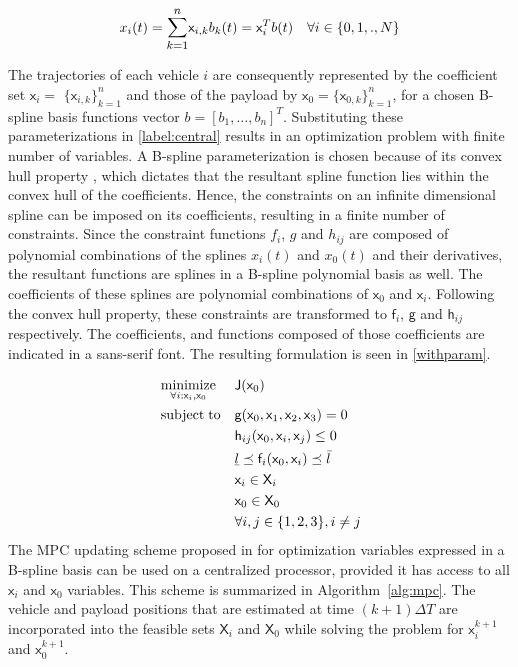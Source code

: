 \documentclass[letterpaper, 10 pt, conference]{ieeeconf}
\newcommand{\ubar}[1]{\text{\b{$#1$}}}
\DeclareMathOperator*{\minimize}{minimize}
\DeclareMathOperator*{\subj}{subject\;to}
\newcommand{\cx}{\textsf{x}}
\newcommand{\J}{\textsf{J}}
\newcommand{\cf}{\textsf{f}}
\newcommand{\cg}{\textsf{g}}
\newcommand{\ch}{\textsf{h}}
\newcommand{\X}{\textsf{X}}
\begin{document}
\begin{equation}\label{spline}
x_i(t) = \mathlarger{\sum\limits_{k=1}^{n}} \cx_{i,k}b_k(t) = \cx_i^Tb(t) \quad \forall i \in \{0,1,.,N\}
\end{equation}

 The trajectories of each vehicle $i$ are consequently represented by the coefficient set $\cx_i$$=$ $\{\cx_{i,k}\}_{k=1}^{n}$ and those of the payload by $\cx_0$$=$$\{\cx_{0,k}\}_{k=1}^{n}$, for a chosen B-spline basis functions vector $b = [b_1,\ldots,b_n]^T$. Substituting these parameterizations in \eqref{label:central} results in an optimization problem with finite number of variables. A B-spline parameterization is chosen because of its convex hull property \cite{c15}, which dictates that the resultant spline function lies within the convex hull of the coefficients. Hence, the constraints on an infinite dimensional spline can be imposed on its coefficients, resulting in a finite number of constraints. Since the constraint functions $f_i$, $g$ and $h_{ij}$ are composed of polynomial combinations of the splines $x_i(t)$ and $x_0(t)$ and their derivatives, the resultant functions are splines in a B-spline polynomial basis as well. The coefficients of these splines are polynomial combinations of $\cx_0$ and $\cx_i$. Following the convex hull property, these constraints are transformed to $\cf_i$, $\cg$ and $\ch_{ij}$ respectively. The coefficients, and functions composed of those coefficients are indicated in a sans-serif font. 
The resulting formulation is seen in \eqref{withparam}. 

 \begin{equation}
   \label{withparam}
   \begin{aligned}
     & \minimize_{\forall i:\cx_i,\cx_0} &&  \J(\cx_0) \\
     & \subj
     &      & \cg(\cx_0,\cx_1,\cx_2,\cx_3) = 0 \\
     &        && \ch_{ij}(\cx_0,\cx_i,\cx_j) \leq 0 \\
     &	&& \ubar{l} \preceq \cf_i(\cx_0,\cx_i) \preceq \bar{l}\\
     &        && \cx_i \in \X_i \\
     &        && \cx_0 \in \X_0 \\
     &                                && \forall i,j \in \{1,2,3\}, i \neq j
   \end{aligned}
 \end{equation}
 The MPC updating scheme proposed in \cite{c16} for optimization variables expressed in a B-spline basis can be used on a centralized processor, provided it has access to all $\cx_i$ and $\cx_0$ variables. This scheme is summarized in Algorithm~\ref{alg:mpc}. The vehicle and payload positions that are estimated at time $(k+1)\Delta T$ are incorporated into the feasible sets $\X_i$ and $\X_0$ while solving the problem for $\cx_i^{k+1}$ and $\cx_0^{k+1}$.
\end{document}
